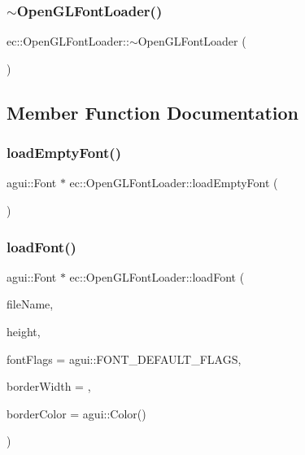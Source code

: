 \subsubsection{\texorpdfstring{$\sim$\+Open\+G\+L\+Font\+Loader()}{~OpenGLFontLoader()}}
{\footnotesize\ttfamily ec\+::\+Open\+G\+L\+Font\+Loader\+::$\sim$\+Open\+G\+L\+Font\+Loader (\begin{DoxyParamCaption}{ }\end{DoxyParamCaption})\hspace{0.3cm}{\ttfamily [default]}}



\subsection{Member Function Documentation}
\mbox{\label{classec_1_1_open_g_l_font_loader_acd2b5a35ecf682fecde27cee63813589}} 
\subsubsection{\texorpdfstring{load\+Empty\+Font()}{loadEmptyFont()}}
{\footnotesize\ttfamily agui\+::\+Font $\ast$ ec\+::\+Open\+G\+L\+Font\+Loader\+::load\+Empty\+Font (\begin{DoxyParamCaption}{ }\end{DoxyParamCaption})\hspace{0.3cm}{\ttfamily [override]}}

\mbox{\label{classec_1_1_open_g_l_font_loader_ae5b0e8420e508ec181a551ead035513f}} 
\subsubsection{\texorpdfstring{load\+Font()}{loadFont()}}
{\footnotesize\ttfamily agui\+::\+Font $\ast$ ec\+::\+Open\+G\+L\+Font\+Loader\+::load\+Font (\begin{DoxyParamCaption}\item[{const std\+::string \&}]{file\+Name,  }\item[{int}]{height,  }\item[{agui\+::\+Font\+Flags}]{font\+Flags = {\ttfamily agui\+:\+:FONT\+\_\+DEFAULT\+\_\+FLAGS},  }\item[{float}]{border\+Width = {},  }\item[{agui\+::\+Color}]{border\+Color = {\ttfamily agui\+:\+:Color()} }\end{DoxyParamCaption})\hspace{0.3cm}{\ttfamily [override]}}



